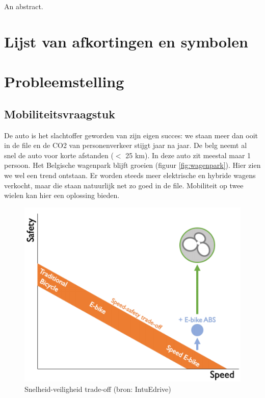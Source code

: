 \documentclass[12pt,a4paper,oneside]{book}
\begin{document}
An abstract.
\tableofcontents
\listoffigures
{}

\chapter{Lijst van afkortingen en symbolen}
\printglossary[type=\acronymtype,title=Afkortingen]
\printglossary[title=Symbolen]

\mainmatter
{}

\chapter{Probleemstelling}
\section{Mobiliteitsvraagstuk}
De auto is het slachtoffer geworden van zijn eigen succes: we staan meer dan ooit in de file en de CO2 van personenverkeer stijgt jaar na jaar. De belg neemt al snel de auto voor korte afstanden ($<$ 25 km). In deze auto zit meestal maar 1 persoon. Het Belgische wagenpark blijft groeien (figuur \ref{fig:wagenpark}). Hier zien we wel een trend ontstaan. Er worden steeds meer elektrische en hybride wagens verkocht, maar die staan natuurlijk net zo goed in de file. Mobiliteit op twee wielen kan hier een oplossing bieden.
\\

\begin{figure}
  \centering
  \includegraphics[width=1.1\linewidth]{images/snelheid-veiligheid-tradeoff.png}
  \caption{Snelheid-veiligheid trade-off (bron: IntuEdrive)}
  \label{fig:snelheid-veiligheid trade-off (bron: IntuEdrive)}
\end{figure}
\end{document}

